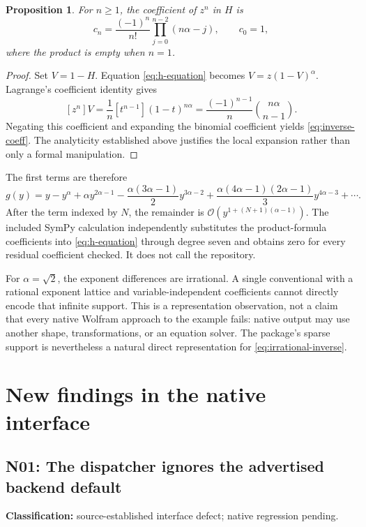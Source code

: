 \documentclass[11pt,letterpaper]{article}
\newcommand{\code}[1]{\texttt{\detokenize{#1}}}
\newcommand{\OO}{\mathcal O}
\newcommand{\finding}[3]{\subsection{#1: #2}\textbf{Classification:} #3.\par}
\newtheorem{proposition}{Proposition}
\begin{document}
\begin{proposition}
For $n\geq1$, the coefficient of $z^n$ in $H$ is
\begin{equation}\label{eq:inverse-coeff}
 c_n=\frac{(-1)^n}{n!}\prod_{j=0}^{n-2}(n\alpha-j),\qquad c_0=1,
\end{equation}
where the product is empty when $n=1$.
\end{proposition}
\begin{proof}
Set $V=1-H$. Equation \eqref{eq:h-equation} becomes $V=z(1-V)^\alpha$. Lagrange's coefficient identity gives
\[
 [z^n]V=\frac1n[t^{n-1}](1-t)^{n\alpha}
       =\frac{(-1)^{n-1}}n\binom{n\alpha}{n-1}.
\]
Negating this coefficient and expanding the binomial coefficient yields \eqref{eq:inverse-coeff}. The analyticity established above justifies the local expansion rather than only a formal manipulation.
\end{proof}

The first terms are therefore
\begin{equation}\label{eq:irrational-inverse}
 g(y)=y-y^\alpha+\alpha y^{2\alpha-1}
 -\frac{\alpha(3\alpha-1)}2y^{3\alpha-2}+
 \frac{\alpha(4\alpha-1)(2\alpha-1)}3y^{4\alpha-3}+\cdots.
\end{equation}
After the term indexed by $N$, the remainder is $\OO(y^{1+(N+1)(\alpha-1)})$. The included SymPy calculation independently substitutes the product-formula coefficients into \eqref{eq:h-equation} through degree seven and obtains zero for every residual coefficient checked. It does not call the repository.

For $\alpha=\sqrt2$, the exponent differences are irrational. A single conventional \code{SeriesData} with a rational exponent lattice and variable-independent coefficients cannot directly encode that infinite support. This is a representation observation, not a claim that every native Wolfram approach to the example fails: native output may use another shape, transformations, or an equation solver. The package's sparse support is nevertheless a natural direct representation for \eqref{eq:irrational-inverse}.\cite{seriesdata}

\section{New findings in the native interface}

\finding{N01}{The dispatcher ignores the advertised backend default}{source-established interface defect; native regression pending}
\end{document}
